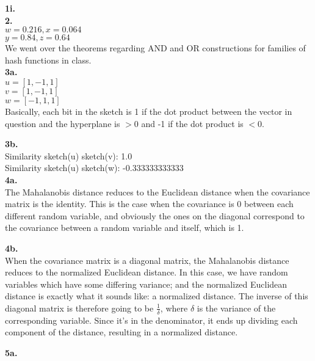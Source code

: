 \documentclass[10pt]{amsart}
\begin{document}
\textbf{1i.} \\


\textbf{2.} \\
  $w = 0.216, x = 0.064$ \\
  $y = 0.84, z = 0.64$ \\

  We went over the theorems regarding AND and OR constructions for families of
  hash functions in class. \\

\textbf{3a.} \\

  $u = [1, -1, 1]$ \\ 
  $v = [1, -1, 1]$ \\ 
  $w = [-1, 1, 1]$ \\

  Basically, each bit in the sketch is 1 if the dot product between the
  vector in question and the hyperplane is $> 0$ and -1 if the dot product 
  is $< 0$.

\textbf{3b.} \\

Similarity sketch(u) sketch(v): 1.0 \\
Similarity sketch(u) sketch(w): -0.333333333333 \\

\textbf{4a.} \\

The Mahalanobis distance reduces to the Euclidean distance when the covariance
matrix is the identity. This is the case when the covariance is 0 between each
different random variable, and obviously the ones on the diagonal correspond to
the covariance between a random variable and itself, which is 1.

\textbf{4b.} \\

When the covariance matrix is a diagonal matrix, the Mahalanobis distance
reduces to the normalized Euclidean distance. In this case, we have random
variables which have some differing variance; and the normalized Euclidean
distance is exactly what it sounds like: a normalized distance. The inverse
of this diagonal matrix is therefore going to be $\frac{1}{\delta}$, where
$\delta$ is the variance of the corresponding variable. Since it's in the
denominator, it ends up dividing each component of the distance, resulting in
a normalized distance.

\textbf{5a.} \\
\end{document}
